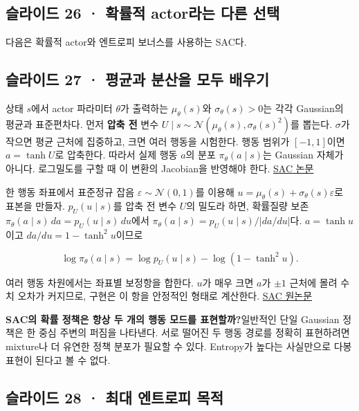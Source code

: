 \documentclass[11pt,a4paper]{article}
\begin{document}
\subsection{슬라이드 26 · 확률적 actor라는 다른 선택}

다음은 확률적 actor와 엔트로피 보너스를 사용하는 SAC다.\par

\subsection{슬라이드 27 · 평균과 분산을 모두 배우기}

상태 $s$에서 actor 파라미터 $\theta$가 출력하는 $\mu_\theta(s)$와 $\sigma_\theta(s)>0$는 각각 Gaussian의 평균과 표준편차다. 먼저 \textbf{압축 전} 변수 $U\mid s\sim\mathcal N(\mu_\theta(s),\sigma_\theta(s)^2)$를 뽑는다. $\sigma$가 작으면 평균 근처에 집중하고, 크면 여러 행동을 시험한다. 행동 범위가 $[-1,1]$이면 $a=\tanh U$로 압축한다. 따라서 실제 행동 $a$의 분포 $\pi_\theta(a\mid s)$는 Gaussian 자체가 아니다. 로그밀도를 구할 때 이 변환의 Jacobian을 반영해야 한다. \href{https://arxiv.org/abs/1801.01290}{SAC 논문}\par

한 행동 좌표에서 표준정규 잡음 $\varepsilon\sim\mathcal N(0,1)$를 이용해 $u=\mu_\theta(s)+\sigma_\theta(s)\varepsilon$로 표본을 만들자. $p_U(u\mid s)$를 압축 전 변수 $U$의 밀도라 하면, 확률질량 보존 $\pi_\theta(a\mid s)\,da=p_U(u\mid s)\,du$에서 $\pi_\theta(a\mid s)=p_U(u\mid s)/|da/du|$다. $a=\tanh u$이고 $da/du=1-\tanh^2u$이므로\par

\[
\log\pi_\theta(a\mid s)=\log p_U(u\mid s)
-\log(1-\tanh^2u).
\]

여러 행동 차원에서는 좌표별 보정항을 합한다. $u$가 매우 크면 $a$가 $\pm1$ 근처에 몰려 수치 오차가 커지므로, 구현은 이 항을 안정적인 형태로 계산한다. \href{https://arxiv.org/abs/1801.01290}{SAC 원논문}\par

\par\medskip\noindent\textbf{SAC의 확률 정책은 항상 두 개의 행동 모드를 표현할까?}\quad 일반적인 단일 Gaussian 정책은 한 중심 주변의 퍼짐을 나타낸다. 서로 떨어진 두 행동 경로를 정확히 표현하려면 mixture나 더 유연한 정책 분포가 필요할 수 있다. Entropy가 높다는 사실만으로 다봉 표현이 된다고 볼 수 없다.\par

\subsection{슬라이드 28 · 최대 엔트로피 목적}
\end{document}

